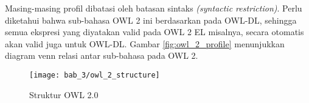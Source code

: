 Masing-masing profil dibatasi oleh batasan sintaks \emph{(syntactic restriction)}. Perlu diketahui bahwa sub-bahasa OWL 2 ini berdasarkan pada OWL-DL, sehingga semua ekspresi yang diyatakan valid pada OWL 2 EL misalnya, secara otomatis akan valid juga untuk OWL-DL. Gambar \ref{fig:owl_2_profile} menunjukkan diagram venn relasi antar sub-bahasa pada OWL 2.

\begin{figure}[ht]
	\centering
	\texttt{[image: bab\_3/owl\_2\_structure]}
	\caption{Struktur OWL 2.0}
	\label{fig:owl_2_structure}
\end{figure}